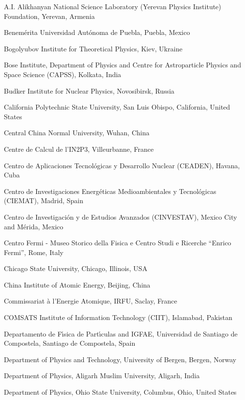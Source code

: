 \begin{flushleft}
\begin{Authlist}
\item {}A.I. Alikhanyan National Science Laboratory (Yerevan Physics Institute) Foundation, Yerevan, Armenia
\item {}Benem\'{e}rita Universidad Aut\'{o}noma de Puebla, Puebla, Mexico
\item {}Bogolyubov Institute for Theoretical Physics, Kiev, Ukraine
\item {}Bose Institute, Department of Physics and Centre for Astroparticle Physics and Space Science (CAPSS), Kolkata, India
\item {}Budker Institute for Nuclear Physics, Novosibirsk, Russia
\item {}California Polytechnic State University, San Luis Obispo, California, United States
\item {}Central China Normal University, Wuhan, China
\item {}Centre de Calcul de l'IN2P3, Villeurbanne, France
\item {}Centro de Aplicaciones Tecnol\'{o}gicas y Desarrollo Nuclear (CEADEN), Havana, Cuba
\item {}Centro de Investigaciones Energ\'{e}ticas Medioambientales y Tecnol\'{o}gicas (CIEMAT), Madrid, Spain
\item {}Centro de Investigaci\'{o}n y de Estudios Avanzados (CINVESTAV), Mexico City and M\'{e}rida, Mexico
\item {}Centro Fermi - Museo Storico della Fisica e Centro Studi e Ricerche ``Enrico Fermi'', Rome, Italy
\item {}Chicago State University, Chicago, Illinois, USA
\item {}China Institute of Atomic Energy, Beijing, China
\item {}Commissariat \`{a} l'Energie Atomique, IRFU, Saclay, France
\item {}COMSATS Institute of Information Technology (CIIT), Islamabad, Pakistan
\item {}Departamento de F\'{\i}sica de Part\'{\i}culas and IGFAE, Universidad de Santiago de Compostela, Santiago de Compostela, Spain
\item {}Department of Physics and Technology, University of Bergen, Bergen, Norway
\item {}Department of Physics, Aligarh Muslim University, Aligarh, India
\item {}Department of Physics, Ohio State University, Columbus, Ohio, United States

\end{Authlist}
\end{flushleft}

